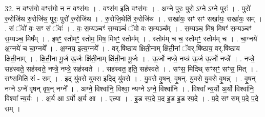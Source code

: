 \documentclass[17pt]{extarticle}
\begin{document}
32. न वꣳस॑गो॒ वꣳस॑गो॒ न न वꣳस॑गः । . वꣳस॑ग॒ इति॒ वꣳस॑गः । . अग्ने॒ पुरः॒ पुरो ऽग्ने ऽग्ने॒ पुरः॑ । . पुरो॑ रु॒रोजि॑थ रु॒रोजि॑थ॒ पुरः॒ पुरो॑ रु॒रोजि॑थ । . रु॒रोजि॒थेति॑ रु॒रोजि॑थ । . सखा॑यः॒ सꣳ सꣳ सखा॑यः॒ सखा॑यः॒ सम् । . सं ॅवो॑ वः॒ सꣳ सं ॅवः॑ । . वः॒ स॒म्यञ्चꣳ॑ स॒म्यञ्चं॑ ॅवो वः स॒म्यञ्च᳚म् । . स॒म्यञ्च॒ मिष॒ मिषꣳ॑ स॒म्यञ्चꣳ॑ स॒म्यञ्च॒ मिष᳚म् । . इषꣳ॒॒ स्तोमꣳ॒॒ स्तोम॒ मिष॒ मिषꣳ॒॒ स्तोम᳚म् । . स्तोम॑म् च च॒ स्तोमꣳ॒॒ स्तोम॑म् च । . चा॒ग्नये॑ अ॒ग्नये॑ च चा॒ग्नये᳚ । . अ॒ग्नय॒ इत्य॒ग्नये᳚ । . वर्.षि॑ष्ठाय क्षिती॒नाम् क्षि॑ती॒नां ॅवर्.षि॑ष्ठाय॒ वर्.षि॑ष्ठाय क्षिती॒नाम् । . क्षि॒ती॒ना मू॒र्ज ऊ॒र्जः क्षि॑ती॒नाम् क्षि॑ती॒ना मू॒र्जः । . ऊ॒र्जो नप्त्रे॒ नप्त्र॑ ऊ॒र्ज ऊ॒र्जो नप्त्रे᳚ । . नप्त्रे॒ सह॑स्वते॒ सह॑स्वते॒ नप्त्रे॒ नप्त्रे॒ सह॑स्वते । . सह॑स्वत॒ इति॒ सह॑स्वते । . सꣳस॒ मिदिथ् सꣳसꣳ॒॒ सꣳस॒ मित् । . सꣳस॒मिति॒ सं - स॒म् । . इद् यु॑वसे युवस॒ इदिद् यु॑वसे । . यु॒व॒से॒ वृ॒ष॒न्॒. वृ॒ष॒न्॒. यु॒व॒से॒ यु॒व॒से॒ वृ॒ष॒न्न् । . वृ॒ष॒न् नग्ने ऽग्ने॑ वृषन् वृष॒न् नग्ने᳚ । . अग्ने॒ विश्वा॑नि॒ विश्वा॒ न्यग्ने ऽग्ने॒ विश्वा॑नि । . विश्वा᳚ न्य॒र्यो अ॒र्यो विश्वा॑नि॒ विश्वा᳚ न्य॒र्यः । . अ॒र्य आ ऽर्यो अ॒र्य आ । . एत्या । . इ॒ड स्प॒दे प॒द इ॒ड इ॒ड स्प॒दे । . प॒दे सꣳ सम् प॒दे प॒दे सम् । \newline
\end{document}

